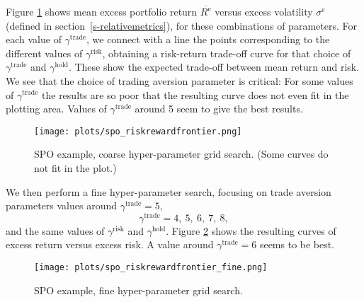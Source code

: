 \documentclass[openany]{now}
\newcommand{\Rep}{R^\mathrm{e}}
\renewcommand{\S}{section~}
\begin{document}
Figure \ref{fig:spo-frontier} shows mean excess portfolio return $\overline{\Rep}$
versus excess volatility $\sigma^\mathrm{e}$
(defined in \S\ref{s-relativemetrics}),
for these combinations of parameters. For each
value of $\gamma^\text{trade}$, we connect with a line
the points corresponding to the different values of
$\gamma^\text{risk}$, obtaining a
risk-return trade-off curve for that choice of $\gamma^\text{trade}$
and $\gamma^\text{hold}$.
These show the expected trade-off between mean return and risk.
We see that the choice of trading aversion parameter is critical:
For some values of $\gamma^\text{trade}$ the results are so poor that
the resulting curve does not even fit in the plotting area.
Values of $\gamma^\text{trade}$ around 5
seem to give the best results.
\begin{figure}
\begin{center}
\texttt{[image: plots/spo\_riskrewardfrontier.png]}
\end{center}
\caption{SPO example, coarse hyper-parameter grid search.
(Some curves
do not fit in the plot.)
}
\label{fig:spo-frontier}
\end{figure}

We then perform a fine hyper-parameter search,
focusing on trade aversion parameters values around
$\gamma^\text{trade} = 5$,
\[
\gamma^\text{trade} =4,~ 5,~ 6,~ 7,~ 8,
\]
and the same values of $\gamma^\mathrm{risk}$ and $\gamma^\mathrm{hold}$.
Figure \ref{fig:spo-frontier-fine} shows the resulting curves of excess return
versus excess risk. A value around $\gamma^\text{trade}=6$ seems to be best.
\begin{figure}
\begin{center}
\texttt{[image: plots/spo\_riskrewardfrontier\_fine.png]}
\end{center}
\caption{SPO example, fine hyper-parameter grid search.
}
\label{fig:spo-frontier-fine}
\end{figure}
\end{document}
